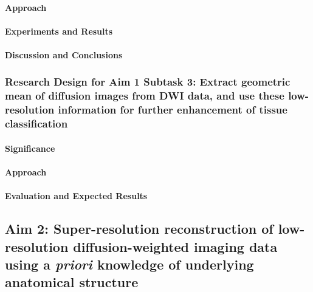 \paragraph{Approach}

\paragraph{Experiments and Results}

\paragraph{Discussion and Conclusions}

\subsubsection{Research Design for Aim 1 Subtask 3: Extract geometric mean of diffusion images from DWI data, and use these low-resolution information for further enhancement of tissue classification}
\label{section:Aim1Subtask3ResearchDesign} %

\paragraph{Significance}

\paragraph{Approach}

\paragraph{Evaluation and Expected Results}




















\clearpage %
\subsection{Aim 2: Super-resolution reconstruction of low-resolution diffusion-weighted imaging data using a \emph{priori} knowledge of underlying anatomical structure}
\label{subsection:Aim2ResearchDesign}

